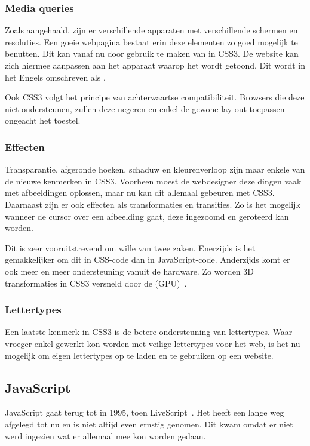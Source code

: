 \subsubsection{Media queries}
Zoals aangehaald, zijn er verschillende apparaten met verschillende schermen en resoluties. 
Een goeie webpagina bestaat erin deze elementen zo goed mogelijk te benutten. 
Dit kan vanaf nu door gebruik te maken van  in CSS3. 
De website kan zich hiermee aanpassen aan het apparaat waarop het wordt getoond. 
Dit wordt in het Engels omschreven als .

Ook CSS3 volgt het principe van achterwaartse compatibiliteit. 
Browsers die deze  niet ondersteunen, zullen deze negeren en enkel de gewone lay-out toepassen ongeacht het toestel.

\subsubsection{Effecten}
Transparantie, afgeronde hoeken, schaduw en kleurenverloop zijn maar enkele van de nieuwe kenmerken in CSS3. 
Voorheen moest de webdesigner deze dingen vaak met afbeeldingen oplossen, maar nu kan dit allemaal gebeuren met CSS3. 
Daarnaast zijn er ook effecten als transformaties en transities. 
Zo is het mogelijk wanneer de cursor over een afbeelding gaat, deze ingezoomd en geroteerd kan worden. 

Dit is zeer vooruitstrevend om wille van twee zaken. 
Enerzijds is het gemakkelijker om dit in CSS-code dan in JavaScript-code. 
Anderzijds komt er ook meer en meer ondersteuning vanuit de hardware. 
Zo worden 3D transformaties in CSS3 versneld door de  (GPU)~\cite{Hales2012,Kool2012}.

\subsubsection{Lettertypes}
Een laatste kenmerk in CSS3 is de betere ondersteuning van lettertypes. 
Waar vroeger enkel gewerkt kon worden met veilige lettertypes voor het web, is het nu mogelijk om eigen lettertypes op te laden en te gebruiken op een website.

\subsection{JavaScript}
\label{ref:javascript}
JavaScript gaat terug tot in 1995, toen LiveScript~\cite{McFarland2011}. 
Het heeft een lange weg afgelegd tot nu en is niet altijd even ernstig genomen. 
Dit kwam omdat er niet werd ingezien wat er allemaal mee kon worden gedaan. 

